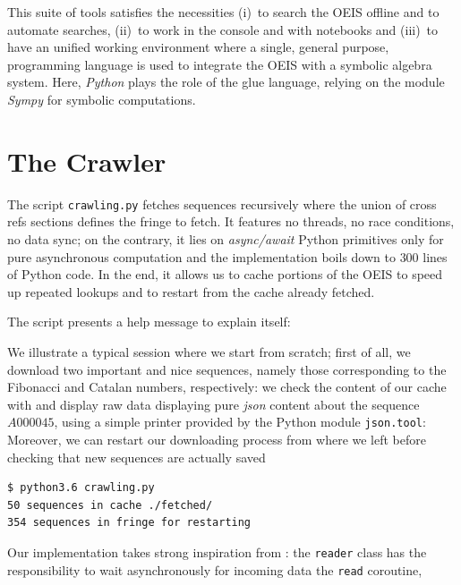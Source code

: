 
This suite of tools satisfies the necessities (i)~to search the OEIS offline
and to automate searches, (ii)~to work in the console and with notebooks and
(iii)~to have an unified working environment where a single, general purpose,
programming language is used to integrate the OEIS with a symbolic algebra
system. Here, \textit{Python} plays the role of the glue language, relying
on the module \textit{Sympy} for symbolic computations.

\section{The Crawler}

The script \verb|crawling.py| fetches sequences recursively where the union of
cross refs sections defines the fringe to fetch.  It features no threads, no
race conditions, no data sync; on the contrary, it lies on \textit{async/await}
Python primitives only for pure asynchronous computation and the implementation
boils down to $300$ lines of Python code.  In the end, it allows us to cache
portions of the OEIS to speed up repeated lookups and to restart from the cache
already fetched.

The script presents a help message to explain itself:

We illustrate a typical session where we start from scratch; first of all, we
download two important and nice sequences, namely those corresponding to the
Fibonacci and Catalan numbers, respectively:
we check the content of our cache with
and display raw data displaying pure \textit{json} content about
the sequence $A000045$, using a simple printer provided by the Python module
\verb|json.tool|:
Moreover, we can restart our downloading process from where we left before
checking that new sequences are actually saved
\begin{Verbatim}[fontsize=\small]
$ python3.6 crawling.py
50 sequences in cache ./fetched/
354 sequences in fringe for restarting
\end{Verbatim}


Our implementation takes strong inspiration from
\citep{VANROSSUM:DAVIS:async:await}: the \verb|reader| class has the
responsibility to wait asynchronously for incoming data the \verb|read|
coroutine,
\inputminted[fontsize=\small,stripnl=false,firstline=28,lastline=39]
    {python}{deps/oeis-tools/src/crawling.py}

